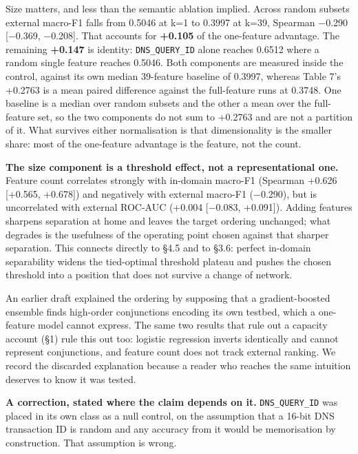\documentclass[journal]{IEEEtran}
\begin{document}
Size matters, and less than the semantic ablation implied. Across random subsets external macro-F1 falls from 0.5046 at k=1 to 0.3997 at k=39, Spearman $-$0.290 [$-$0.369, $-$0.208]. That accounts for \textbf{+0.105} of the one-feature advantage. The remaining \textbf{+0.147} is identity: \texttt{DNS\_QUERY\_ID} alone reaches 0.6512 where a random single feature reaches 0.5046. Both components are measured inside the control, against its own median 39-feature baseline of 0.3997, whereas Table 7's +0.2763 is a mean paired difference against the full-feature runs at 0.3748. One baseline is a median over random subsets and the other a mean over the full-feature set, so the two components do not sum to +0.2763 and are not a partition of it. What survives either normalisation is that dimensionality is the smaller share: most of the one-feature advantage is the feature, not the count.

\textbf{The size component is a threshold effect, not a representational one.} Feature count correlates strongly with in-domain macro-F1 (Spearman +0.626 [+0.565, +0.678]) and negatively with external macro-F1 ($-$0.290), but is uncorrelated with external ROC-AUC (+0.004 [$-$0.083, +0.091]). Adding features sharpens separation at home and leaves the target ordering unchanged; what degrades is the usefulness of the operating point chosen against that sharper separation. This connects directly to §4.5 and to §3.6: perfect in-domain separability widens the tied-optimal threshold plateau and pushes the chosen threshold into a position that does not survive a change of network.

An earlier draft explained the ordering by supposing that a gradient-boosted ensemble finds high-order conjunctions encoding its own testbed, which a one-feature model cannot express. The same two results that rule out a capacity account (§1) rule this out too: logistic regression inverts identically and cannot represent conjunctions, and feature count does not track external ranking. We record the discarded explanation because a reader who reaches the same intuition deserves to know it was tested.

\textbf{A correction, stated where the claim depends on it.} \texttt{DNS\_QUERY\_ID} was placed in its own class as a null control, on the assumption that a 16-bit DNS transaction ID is random and any accuracy from it would be memorisation by construction. That assumption is wrong.
\end{document}
